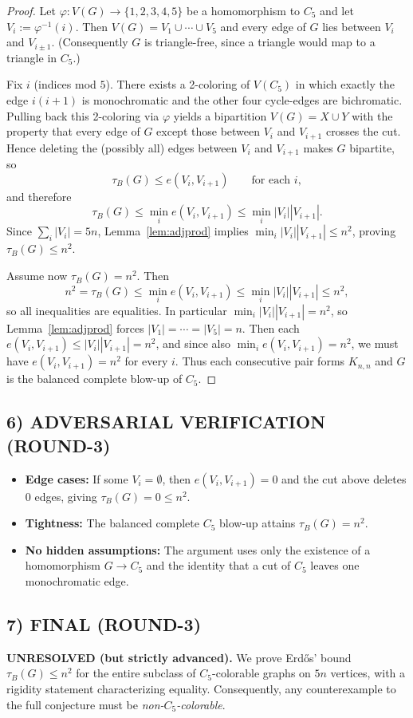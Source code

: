 \begin{proof}
Let $\varphi:V(G)\to \{1,2,3,4,5\}$ be a homomorphism to $C_5$ and let $V_i:=\varphi^{-1}(i)$.
Then $V(G)=V_1\cup\cdots\cup V_5$ and every edge of $G$ lies between $V_i$ and $V_{i\pm 1}$.
(Consequently $G$ is triangle-free, since a triangle would map to a triangle in $C_5$.)

Fix $i$ (indices mod $5$).  There exists a 2-coloring of $V(C_5)$ in which
exactly the edge $i(i+1)$ is monochromatic and the other four cycle-edges are bichromatic.
Pulling back this 2-coloring via $\varphi$ yields a bipartition $V(G)=X\cup Y$ with the property
that every edge of $G$ except those between $V_i$ and $V_{i+1}$ crosses the cut.
Hence deleting the (possibly all) edges between $V_i$ and $V_{i+1}$ makes $G$ bipartite, so
\[
\tau_B(G)\le e(V_i,V_{i+1})\qquad \text{for each } i,
\]
and therefore
\[
\tau_B(G)\le \min_i e(V_i,V_{i+1}) \le \min_i |V_i||V_{i+1}|.
\]
Since $\sum_i |V_i|=5n$, Lemma~\ref{lem:adjprod} implies
$\min_i |V_i||V_{i+1}|\le n^2$, proving $\tau_B(G)\le n^2$.

Assume now $\tau_B(G)=n^2$.  Then
\[
 n^2=\tau_B(G)\le \min_i e(V_i,V_{i+1})\le \min_i |V_i||V_{i+1}|\le n^2,
\]
so all inequalities are equalities.  In particular $\min_i |V_i||V_{i+1}|=n^2$,
so Lemma~\ref{lem:adjprod} forces $|V_1|=\cdots=|V_5|=n$.
Then each $e(V_i,V_{i+1})\le |V_i||V_{i+1}|=n^2$, and since also
$\min_i e(V_i,V_{i+1})=n^2$, we must have $e(V_i,V_{i+1})=n^2$ for every $i$.
Thus each consecutive pair forms $K_{n,n}$ and $G$ is the balanced complete blow-up of $C_5$.
\end{proof}

\subsection*{6) ADVERSARIAL VERIFICATION (ROUND-3)}
\begin{itemize}
\item \textbf{Edge cases:} If some $V_i=\emptyset$, then $e(V_i,V_{i+1})=0$ and the cut above
      deletes $0$ edges, giving $\tau_B(G)=0\le n^2$.
\item \textbf{Tightness:} The balanced complete $C_5$ blow-up attains $\tau_B(G)=n^2$.
\item \textbf{No hidden assumptions:} The argument uses only the existence of a homomorphism
      $G\to C_5$ and the identity that a cut of $C_5$ leaves one monochromatic edge.
\end{itemize}

\subsection*{7) FINAL (ROUND-3)}
\textbf{UNRESOLVED (but strictly advanced).}
We prove Erd\H{o}s' bound $\tau_B(G)\le n^2$ for the entire subclass of
$C_5$-colorable graphs on $5n$ vertices, with a rigidity statement characterizing
equality.  Consequently, any counterexample to the full conjecture must be
\emph{non-$C_5$-colorable}.

